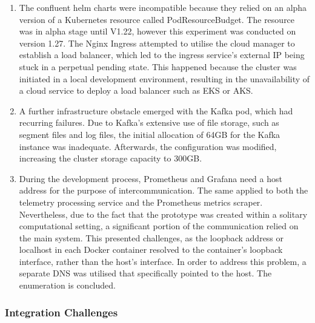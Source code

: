 \documentclass[preprint,12pt]{elsarticle}
\begin{document}
\begin{enumerate} 
  \item The confluent helm charts were incompatible because they relied on an alpha version of a Kubernetes resource called PodResourceBudget. The resource was in alpha stage until V1.22, however this experiment was conducted on version 1.27. The Nginx Ingress attempted to utilise the cloud manager to establish a load balancer, which led to the ingress service's external IP being stuck in a perpetual pending state. This happened because the cluster was initiated in a local development environment, resulting in the unavailability of a cloud service to deploy a load balancer such as EKS or AKS.
    \item A further infrastructure obstacle emerged with the Kafka pod, which had recurring failures. Due to Kafka's extensive use of file storage, such as segment files and log files, the initial allocation of 64GB for the Kafka instance was inadequate. Afterwards, the configuration was modified, increasing the cluster storage capacity to 300GB.
    \item During the development process, Prometheus and Grafana need a host address for the purpose of intercommunication. The same applied to both the telemetry processing service and the Prometheus metrics scraper. Nevertheless, due to the fact that the prototype was created within a solitary computational setting, a significant portion of the communication relied on the main system. This presented challenges, as the loopback address or localhost in each Docker container resolved to the container's loopback interface, rather than the host's interface. In order to address this problem, a separate DNS was utilised that specifically pointed to the host.
The enumeration is concluded.
\end{enumerate} 

\subsubsection{Integration Challenges} 
\end{document}
